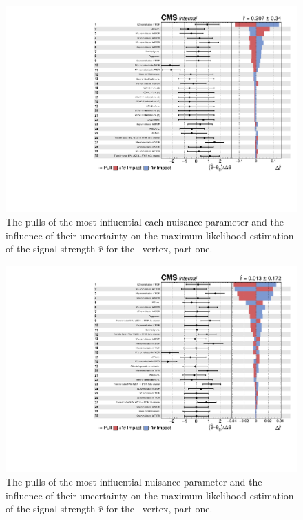\newpage
\begin{figure}[htbp] 
	\centering
	  \includegraphics[page=1,width=.99\linewidth,keepaspectratio]{6_Search/Figures/impact/171102Zut.pdf}
	\caption{The pulls of the most influential each nuisance parameter and the influence of their uncertainty on the maximum likelihood estimation of the signal strength $\hat{r}$ for the \Zut\ vertex, part one.}
	\label{fig:impactsZut1}
\end{figure}


\newpage

\begin{figure}[htbp] 
	\centering
	\includegraphics[page=1,width=.99\linewidth,keepaspectratio]{6_Search/Figures/impact/171102Zct.pdf}
	\caption{The pulls of the most influential nuisance parameter and the influence of their uncertainty on the maximum likelihood estimation of the signal strength $\hat{r}$ for the \Zct\ vertex, part one.}
	\label{fig:impactsZct1}
\end{figure}

